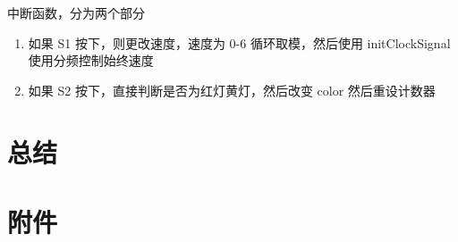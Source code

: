 \documentclass[a4paper,10pt,UTF8]{paper}
\numberwithin{equation}{section}
\numberwithin{figure}{section}
\begin{document}
中断函数，分为两个部分

\begin{enumerate}
  \item 如果 S1 按下，则更改速度，速度为 0-6 循环取模，然后使用 initClockSignal 使用分频控制始终速度
  \item 如果 S2 按下，直接判断是否为红灯黄灯，然后改变 color 然后重设计数器
\end{enumerate}

\section{总结}

\section{附件}
\end{document}

